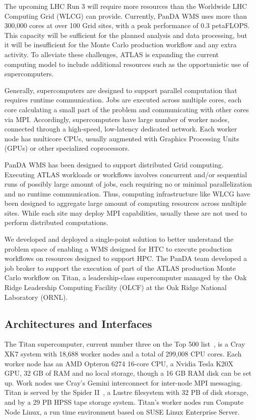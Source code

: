 The upcoming LHC Run 3 will require more resources than the Worldwide LHC
Computing Grid (WLCG) can provide. Currently, PanDA WMS uses more than 300,000
cores at over 100 Grid sites, with a peak performance of 0.3 petaFLOPS. This
capacity will be sufficient for the planned analysis and data processing, but it
will be insufficient for the Monte Carlo production workflow and any extra
activity. To alleviate these challenges, ATLAS is expanding the current
computing model to include additional resources such as the opportunistic use of
supercomputers.

Generally, supercomputers are designed to support parallel computation that
requires runtime communication. Jobs are executed across multiple cores, each
core calculating a small part of the problem and communicating with other cores
via MPI. Accordingly, supercomputers have large number of worker nodes,
connected through a high-speed, low-latency dedicated network. Each worker node
has multicore CPUs, usually augmented with Graphics Processing Units (GPUs) or
other specialized coprocessors.

PanDA WMS has been designed to support distributed Grid computing. Executing
ATLAS workloads or workflows involves concurrent and/or sequential runs of
possibly large amount of jobs, each requiring no or minimal parallelization and
no runtime communication. Thus, computing infrastructure like WLCG have been
designed to aggregate large amount of computing resources across multiple sites.
While each site may deploy MPI capabilities, usually these are not used to
perform distributed computations.

We developed and deployed a single-point solution to better understand the
problem space of enabling a WMS designed for HTC to execute production workflows
on resources designed to support HPC. The PanDA team developed a job broker to
support the execution of part of the ATLAS production Monte Carlo workflow on
Titan, a leadership-class supercomputer managed by the Oak Ridge Leadership
Computing Facility (OLCF) at the Oak Ridge National Laboratory (ORNL).


\subsection{Architectures and Interfaces}
\label{ssec:panda-titan}

The Titan supercomputer, current number three on the Top 500 list~\cite{top500},
is a Cray XK7 system with 18,688 worker nodes and a total of 299,008 CPU cores.
Each worker node has an AMD Opteron  6274 16-core CPU, a Nvidia Tesla K20X GPU,
32 GB of RAM and no local storage, though a 16 GB RAM disk can be set up. Work
nodes use Cray’s Gemini interconnect for inter-node MPI messaging. Titan is
served by the Spider II~\cite{oral2013olcf}, a Lustre filesystem with 32 PB of
disk storage, and by a 29 PB HPSS tape storage system. Titan’s worker nodes run
Compute Node Linux, a run time environment based on SUSE Linux Enterprise
Server.


